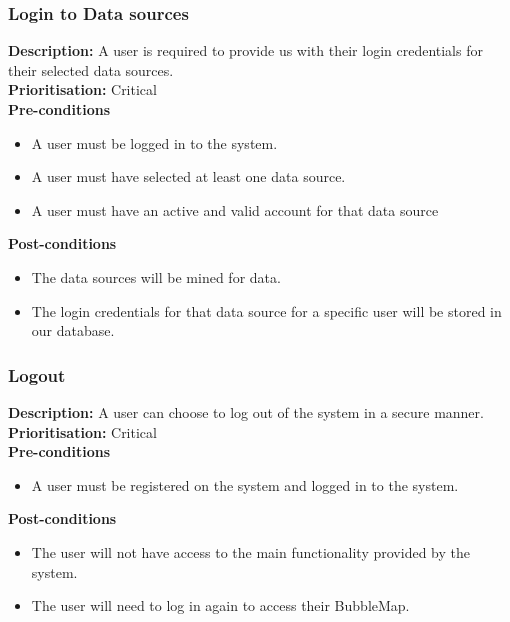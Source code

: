\documentclass[hidelinks,english]{article}
\begin{document}
    		\subsubsection{Login to Data sources}
				\textbf{Description:}  A user is required to provide us with their login credentials for their selected data sources. 
				\\
    			\textbf{Prioritisation:} Critical\\
      			\textbf{Pre-conditions}
    			\begin{itemize}
        			\item A user must be logged in to the system.
        			\item A user must have selected at least one data source.
        			\item A user must have an active and valid account for that data source
    			\end{itemize}
    			\textbf{Post-conditions}
     			\begin{itemize}
        			\item The data sources will be mined for data.
        			\item The login credentials for that data source for a specific user will be stored in our database.
    			\end{itemize}
    		\subsubsection{Logout}
				\textbf{Description:}  A user can choose to log out of the system in a secure manner.
				\\
    			\textbf{Prioritisation:} Critical\\
      			\textbf{Pre-conditions}
    			\begin{itemize}
        			\item A user must be registered on the system and logged in to the system.
    			\end{itemize}
    			\textbf{Post-conditions}
     			\begin{itemize}
        			\item The user will not have access to the main functionality provided by the system.
        			\item The user will need to log in again to access their BubbleMap.
    			\end{itemize}
\end{document}
